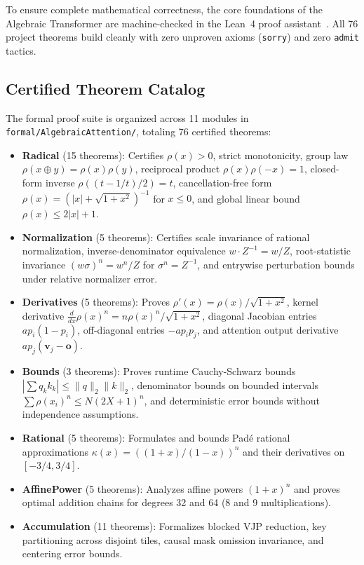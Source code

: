 \documentclass[11pt,a4paper]{article}
\theoremstyle{definition}
\begin{document}
To ensure complete mathematical correctness, the core foundations of the Algebraic Transformer are machine-checked in the Lean~4 proof assistant~\citep{demoura2021lean4,mathlib2020}. All 76 project theorems build cleanly with zero unproven axioms (\texttt{sorry}) and zero \texttt{admit} tactics.

\subsection{Certified Theorem Catalog}
\label{subsec:lean_catalog}

The formal proof suite is organized across 11 modules in \texttt{formal/AlgebraicAttention/}, totaling 76 certified theorems:
\begin{itemize}
    \item \textbf{Radical} (15 theorems): Certifies $\rho(x) > 0$, strict monotonicity, group law $\rho(x \oplus y) = \rho(x)\rho(y)$, reciprocal product $\rho(x)\rho(-x) = 1$, closed-form inverse $\rho((t - 1/t)/2) = t$, cancellation-free form $\rho(x) = (|x| + \sqrt{1+x^2})^{-1}$ for $x \le 0$, and global linear bound $\rho(x) \le 2|x| + 1$.
    \item \textbf{Normalization} (5 theorems): Certifies scale invariance of rational normalization, inverse-denominator equivalence $w \cdot Z^{-1} = w/Z$, root-statistic invariance $(w \sigma)^n = w^n / Z$ for $\sigma^n = Z^{-1}$, and entrywise perturbation bounds under relative normalizer error.
    \item \textbf{Derivatives} (5 theorems): Proves $\rho'(x) = \rho(x)/\sqrt{1+x^2}$, kernel derivative $\frac{d}{dx}\rho(x)^n = n \rho(x)^n / \sqrt{1+x^2}$, diagonal Jacobian entries $a p_i (1 - p_i)$, off-diagonal entries $-a p_i p_j$, and attention output derivative $a p_j (\mathbf{v}_j - \mathbf{o})$.
    \item \textbf{Bounds} (3 theorems): Proves runtime Cauchy-Schwarz bounds $|\sum q_k k_k| \le \|q\|_2 \|k\|_2$, denominator bounds on bounded intervals $\sum \rho(x_i)^n \le N(2X+1)^n$, and deterministic error bounds without independence assumptions.
    \item \textbf{Rational} (5 theorems): Formulates and bounds Padé rational approximations $\kappa(x) = ((1+x)/(1-x))^n$ and their derivatives on $[-3/4, 3/4]$.
    \item \textbf{AffinePower} (5 theorems): Analyzes affine powers $(1+x)^n$ and proves optimal addition chains for degrees 32 and 64 (8 and 9 multiplications).
    \item \textbf{Accumulation} (11 theorems): Formalizes blocked VJP reduction, key partitioning across disjoint tiles, causal mask omission invariance, and centering error bounds.

\end{itemize}
\end{document}
